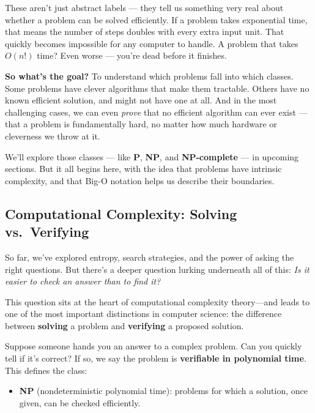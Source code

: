 These aren’t just abstract labels — they tell us something very real about whether a problem can be solved efficiently. If a problem takes exponential time, that means the number of steps doubles with every extra input unit. That quickly becomes impossible for any computer to handle. A problem that takes \( O(n!) \) time? Even worse — you’re dead before it finishes.

\medskip

\noindent\textbf{So what’s the goal?} To understand which problems fall into which classes. Some problems have clever algorithms that make them tractable. Others have no known efficient solution, and might not have one at all. And in the most challenging cases, we can even \textit{prove} that no efficient algorithm can ever exist — that a problem is fundamentally hard, no matter how much hardware or cleverness we throw at it.

\medskip

We’ll explore those classes — like \textbf{P}, \textbf{NP}, and \textbf{NP-complete} — in upcoming sections. But it all begins here, with the idea that problems have intrinsic complexity, and that Big-O notation helps us describe their boundaries.




\subsection{Computational Complexity: Solving vs.\ Verifying}

So far, we've explored entropy, search strategies, and the power of asking the right questions. But there's a deeper question lurking underneath all of this: \emph{Is it easier to check an answer than to find it?}

This question sits at the heart of computational complexity theory—and leads to one of the most important distinctions in computer science: the difference between \textbf{solving} a problem and \textbf{verifying} a proposed solution.

\medskip

\noindent Suppose someone hands you an answer to a complex problem. Can you quickly tell if it's correct? If so, we say the problem is \textbf{verifiable in polynomial time}. This defines the class:

\begin{itemize}
  \item \textbf{NP} (nondeterministic polynomial time): problems for which a solution, once given, can be checked efficiently.
\end{itemize}

